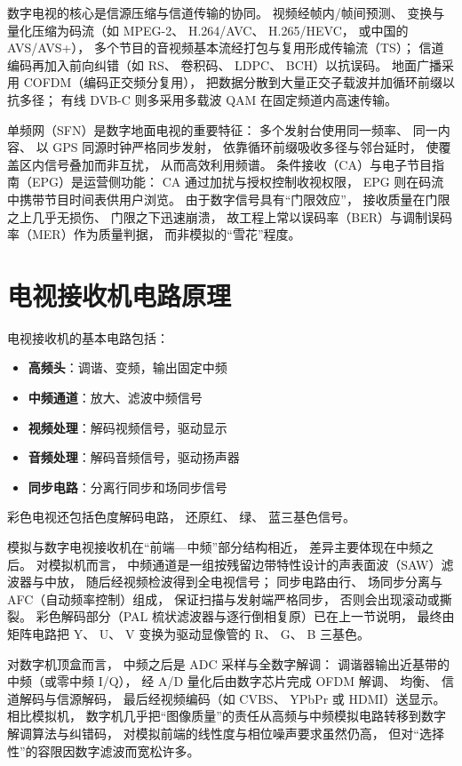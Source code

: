 数字电视的核心是信源压缩与信道传输的协同。
视频经帧内/帧间预测、
变换与量化压缩为码流（如 MPEG-2、
H.264/AVC、
H.265/HEVC，
或中国的 AVS/AVS+），
多个节目的音视频基本流经打包与复用形成传输流（TS）；
信道编码再加入前向纠错（如 RS、
卷积码、
LDPC、
BCH）以抗误码。
地面广播采用 COFDM（编码正交频分复用），
把数据分散到大量正交子载波并加循环前缀以抗多径；
有线 DVB-C 则多采用多载波 QAM 在固定频道内高速传输。

单频网（SFN）是数字地面电视的重要特征：
多个发射台使用同一频率、
同一内容、
以 GPS 同源时钟严格同步发射，
依靠循环前缀吸收多径与邻台延时，
使覆盖区内信号叠加而非互扰，
从而高效利用频谱。
条件接收（CA）与电子节目指南（EPG）是运营侧功能：
CA 通过加扰与授权控制收视权限，
EPG 则在码流中携带节目时间表供用户浏览。
由于数字信号具有“门限效应”，
接收质量在门限之上几乎无损伤、
门限之下迅速崩溃，
故工程上常以误码率（BER）与调制误码率（MER）作为质量判据，
而非模拟的“雪花”程度。

\section{电视接收机电路原理}
\label{sec:tv_circuit_principle}

电视接收机的基本电路包括：

\begin{itemize}
    \item \textbf{高频头}：调谐、变频，输出固定中频
    \item \textbf{中频通道}：放大、滤波中频信号
    \item \textbf{视频处理}：解码视频信号，驱动显示
    \item \textbf{音频处理}：解码音频信号，驱动扬声器
    \item \textbf{同步电路}：分离行同步和场同步信号
\end{itemize}

彩色电视还包括色度解码电路，
还原红、
绿、
蓝三基色信号。

模拟与数字电视接收机在“前端—中频”部分结构相近，
差异主要体现在中频之后。
对模拟机而言，
中频通道是一组按残留边带特性设计的声表面波（SAW）滤波器与中放，
随后经视频检波得到全电视信号；
同步电路由行、
场同步分离与 AFC（自动频率控制）组成，
保证扫描与发射端严格同步，
否则会出现滚动或撕裂。
彩色解码部分（PAL 梳状滤波器与逐行倒相复原）已在上一节说明，
最终由矩阵电路把 Y、
U、
V 变换为驱动显像管的 R、
G、
B 三基色。

对数字机顶盒而言，
中频之后是 ADC 采样与全数字解调：
调谐器输出近基带的中频（或零中频 I/Q），
经 A/D 量化后由数字芯片完成 OFDM 解调、
均衡、
信道解码与信源解码，
最后经视频编码（如 CVBS、
YPbPr 或 HDMI）送显示。
相比模拟机，
数字机几乎把“图像质量”的责任从高频与中频模拟电路转移到数字解调算法与纠错码，
对模拟前端的线性度与相位噪声要求虽然仍高，
但对“选择性”的容限因数字滤波而宽松许多。

